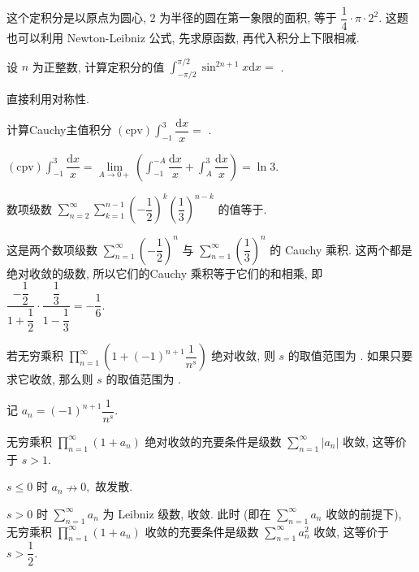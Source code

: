 \begin{solution}
  这个定积分是以原点为圆心, $2$ 为半径的圆在第一象限的面积, 等于 $\dfrac{1}{4} \cdot \pi \cdot 2^2.$ 这题也可以利用 Newton-Leibniz 公式, 先求原函数, 再代入积分上下限相减.
\end{solution}

\begin{question}
  设 $n$ 为正整数, 计算定积分的值 $\int_{-\pi/2}^{\pi/2} \sin^{2n+1} x \mathrm{d} x = $ \fillin[$0$].
\end{question}

\begin{solution}
  直接利用对称性.
\end{solution}

\begin{question}
  计算Cauchy主值积分 $(\text{cpv}) \int_{-1}^{3} \dfrac{\mathrm{d}x}{x} = $ \fillin[$\ln 3$].
\end{question}

\begin{solution}
  $(\text{cpv}) \int_{-1}^{3} \dfrac{\mathrm{d}x}{x} = \lim\limits_{A \to 0+} \left( \int_{-1}^{-A} \dfrac{\mathrm{d}x}{x} + \int_{A}^{3} \dfrac{\mathrm{d}x}{x} \right) = \ln 3.$
\end{solution}

\begin{question}
  数项级数 $\sum\limits_{n=2}^\infty \sum\limits_{k=1}^{n-1} \left(-\dfrac{1}{2}\right)^k \left(\dfrac{1}{3}\right)^{n-k}$ 的值等于\fillin[$-\dfrac{1}{6}$].
\end{question}

\begin{solution}
  这是两个数项级数 $\sum\limits_{n=1}^\infty \left(-\dfrac{1}{2}\right)^n$ 与 $\sum\limits_{n=1}^\infty \left(\dfrac{1}{3}\right)^n$ 的 Cauchy 乘积. 这两个都是绝对收敛的级数, 所以它们的Cauchy 乘积等于它们的和相乘, 即 $\dfrac{-\dfrac{1}{2}}{1 + \dfrac{1}{2}} \cdot \dfrac{\dfrac{1}{3}}{1 - \dfrac{1}{3}} = -\dfrac{1}{6}.$
\end{solution}

\begin{question}
  若无穷乘积 $\prod\limits_{n=1}^\infty \left( 1 + (-1)^{n+1} \dfrac{1}{n^s} \right)$ 绝对收敛, 则 $s$ 的取值范围为 \fillin[$s > 1$]. 如果只要求它收敛, 那么则 $s$ 的取值范围为 \fillin[$s > \dfrac{1}{2}$].
\end{question}

\begin{solution}
  记 $a_n = (-1)^{n+1} \dfrac{1}{n^s}.$

  无穷乘积 $\prod\limits_{n=1}^\infty (1 + a_n)$ 绝对收敛的充要条件是级数 $\sum\limits_{n=1}^\infty \lvert a_n \rvert$ 收敛, 这等价于 $s > 1.$

  $s \leqslant 0$ 时 $a_n \nrightarrow 0,$ 故发散.

  $s > 0$ 时 $\sum\limits_{n=1}^\infty a_n$ 为 Leibniz 级数, 收敛. 此时 (即在 $\sum\limits_{n=1}^\infty a_n$ 收敛的前提下), 无穷乘积 $\prod\limits_{n=1}^\infty (1 + a_n)$ 收敛的充要条件是级数 $\sum\limits_{n=1}^\infty a_n^2$ 收敛, 这等价于 $s > \dfrac{1}{2}.$
\end{solution}

